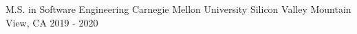 
\begin{cventries}

  \cventry
    {M.S. in Software Engineering} %
    {Carnegie Mellon University Silicon Valley} %
    {Mountain View, CA} %
    {2019 - 2020} %
    {
    }
    



\end{cventries}
